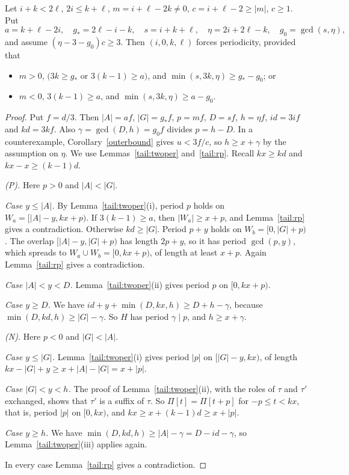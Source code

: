 \begin{theorem}\label{tail:general}
Let \(i+k<2\ell\), \(2i\le k+\ell\), \(m=i+\ell-2k\ne0\), \(c=i+\ell-2\ge|m|\), \(c\ge1\). Put
\[
a=k+\ell-2i,\quad g_*=2\ell-i-k,\quad s=i+k+\ell,\quad \eta=2i+2\ell-k,\quad g_0=\gcd(s,\eta),
\]
and assume \((\eta-3-g_0)c\ge3\). Then \((i,0,k,\ell)\) forces periodicity, provided that
\begin{itemize}
\item[(P)] \(m>0\), \(\bigl(3k\ge g_*\) or \(3(k-1)\ge a\bigr)\), and \(\min(s,3k,\eta)\ge g_*-g_0\); or
\item[(N)] \(m<0\), \(3(k-1)\ge a\), and \(\min(s,3k,\eta)\ge a-g_0\).
\end{itemize}
\end{theorem}
\begin{proof}
Put \(f=d/3\). Then \(|A|=af\), \(|G|=g_*f\), \(p=mf\), \(D=sf\), \(h=\eta f\), \(id=3if\) and \(kd=3kf\). Also \(\gamma=\gcd(D,h)=g_0f\) divides \(p=h-D\). In a counterexample, Corollary~\ref{outerbound} gives \(u<3f/c\), so \(h\ge x+\gamma\) by the assumption on \(\eta\). We use Lemmas~\ref{tail:twoper} and~\ref{tail:rp}. Recall \(kx\ge kd\) and \(kx-x\ge(k-1)d\).

\emph{(P).} Here \(p>0\) and \(|A|<|G|\).

\emph{Case \(y\le|A|\).} By Lemma~\ref{tail:twoper}(i), period \(p\) holds on \(W_a=[|A|-y,kx+p)\). If \(3(k-1)\ge a\), then \(|W_a|\ge x+p\), and Lemma~\ref{tail:rp} gives a contradiction. Otherwise \(kd\ge|G|\). Period \(p+y\) holds on \(W_b=[0,|G|+p)\). The overlap \([|A|-y,|G|+p)\) has length \(2p+y\), so it has period \(\gcd(p,y)\), which spreads to \(W_a\cup W_b=[0,kx+p)\), of length at least \(x+p\). Again Lemma~\ref{tail:rp} gives a contradiction.

\emph{Case \(|A|<y<D\).} Lemma~\ref{tail:twoper}(ii) gives period \(p\) on \([0,kx+p)\).

\emph{Case \(y\ge D\).} We have \(id+y+\min(D,kx,h)\ge D+h-\gamma\), because \(\min(D,kd,h)\ge|G|-\gamma\). So \(H\) has period \(\gamma\mid p\), and \(h\ge x+\gamma\).

\emph{(N).} Here \(p<0\) and \(|G|<|A|\).

\emph{Case \(y\le|G|\).} Lemma~\ref{tail:twoper}(i) gives period \(|p|\) on \([|G|-y,kx)\), of length \(kx-|G|+y\ge x+|A|-|G|=x+|p|\).

\emph{Case \(|G|<y<h\).} The proof of Lemma~\ref{tail:twoper}(ii), with the roles of \(\tau\) and \(\tau'\) exchanged, shows that \(\tau'\) is a suffix of \(\tau\). So \(\Pi[t]=\Pi[t+p]\) for \(-p\le t<kx\), that is, period \(|p|\) on \([0,kx)\), and \(kx\ge x+(k-1)d\ge x+|p|\).

\emph{Case \(y\ge h\).} We have \(\min(D,kd,h)\ge|A|-\gamma=D-id-\gamma\), so Lemma~\ref{tail:twoper}(iii) applies again.

In every case Lemma~\ref{tail:rp} gives a contradiction.
\end{proof}

